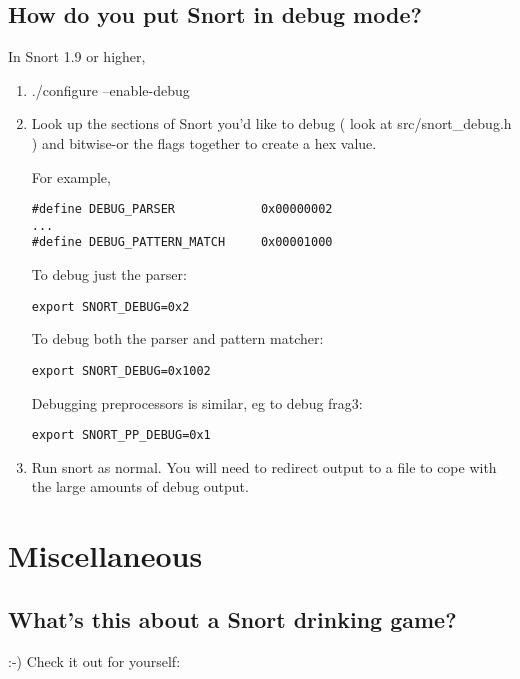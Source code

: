 \documentclass{article}
\begin{document}
\subsection{How do you put Snort in debug mode? }

In Snort 1.9 or higher,

\begin{enumerate}

\item ./configure --enable-debug

\item Look up the sections of Snort you'd like to debug ( look at src/snort\_debug.h )
and bitwise-or the flags together to create a hex value. 

For example, 
\begin{verbatim}
#define DEBUG_PARSER            0x00000002
...
#define DEBUG_PATTERN_MATCH     0x00001000
\end{verbatim}

To debug just the parser:
\begin{verbatim}
export SNORT_DEBUG=0x2
\end{verbatim}

To debug both the parser and pattern matcher:
\begin{verbatim}
export SNORT_DEBUG=0x1002
\end{verbatim}

Debugging preprocessors is similar, eg to debug frag3:
\begin{verbatim}
export SNORT_PP_DEBUG=0x1
\end{verbatim}

\item Run snort as normal.  You will need to redirect output to a file
   to cope with the large amounts of debug output.
\end{enumerate}

\section{Miscellaneous}
\subsection{What's this about a Snort drinking game?}

:-) Check it out for yourself:


\end{document}
